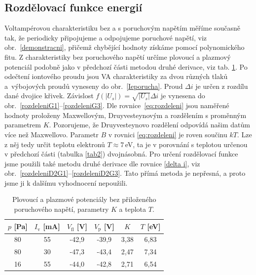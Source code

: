 \documentclass[a4paper,12pt]{article}
\begin{document}
\clearpage
\subsection{Rozdělovací funkce energií}
Voltampérovou charakteristiku bez a s poruchovým napětím měříme současně tak, 
že periodicky připojujeme a odpojujeme poruchové napětí, viz 
obr.~\ref{demonstracni}, přičemž chybějící 
hodnoty získáme pomocí polynomického fitu. Z charakteristiky bez 
poruchového napětí určíme plovoucí a plazmový potenciál podobně jako v 
předchozí části metodou druhé derivace, viz tab. \ref{tab3}. Po odečtení 
iontového proudu jsou VA 
charakteristiky za dvou různých tlaků a~výbojových proudů vyneseny do 
obr.~\ref{Ieporucha}. Proud $\Delta i$ je určen z rozdílu dané dvojice 
křivek. 
Závislost $f(\vert U_s\vert) = \sqrt{\vert U_s\vert}\Delta i$ je vynesena do 
obr.~\ref{rozdeleniG1}--\ref{rozdeleniG3}. Dle rovnice~\eqref{eq:rozdeleni} 
jsou naměřené hodnoty proloženy Maxwellovým, Druyvesteynovým a rozdělením s 
proměnným parametrem $K$. 
Pozorujeme, že Druyvesteynovo rozdělení odpovídá našim datům více než 
Maxwellovo. Parametr $B$ v rovnici \eqref{eq:rozdeleni} je roven součinu $kT$. 
Lze z něj tedy určit teplotu elektronů $T\approx7$\,eV, ta je v porovnání s 
teplotou určenou v předchozí části (tabulka \ref{tab2}) dvojnásobná. Pro 
určení rozdělovací funkce jsme použili také metodu druhé derivace dle rovnice 
\eqref{delta i}, viz obr.~\ref{rozdeleniD2G1}--\ref{rozdeleniD2G3}. Tato přímá 
metoda je nepřesná, a proto jsme ji k dalšímu vyhodnocení nepoužili.


\begin{center}
	\begin{table}[h!]
		\centering
		\caption{Plovoucí a plazmové potenciály bez přiloženého poruchového 
		napětí, parametry $K$ a teplota $T$.}
		\label{tab3}
		\begin{tabular}{|c|c|c|c|c|c|} \hline
			$p$ [\si{\pascal}] & $I_\text{v}$ [\si{\milli\ampere}] &  
			$V_\text{fl}$ [V] & 
			$V_\text{p}$ [V] & $K$ & $T$ [eV] \\ \hline
			80&55&-42,9&-39,9&3,38&6,83\\ \hline
			80&30&-47,3&-43,4&2,47&7,34\\ \hline
			16&55&-44,0&-42,8&2,71&6,54\\ \hline
			
		\end{tabular}
	\end{table}
\end{center}
\end{document}
